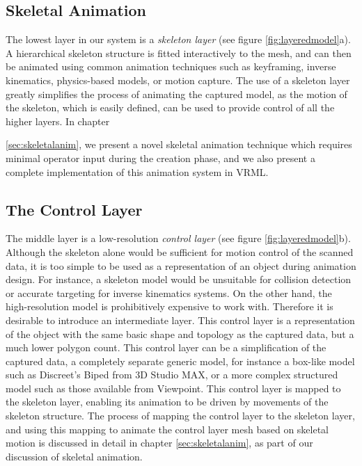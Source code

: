 \subsection{\label{sec:introduction:layered:skeletal}Skeletal Animation}
The lowest layer in our system is a {\it skeleton layer} (see figure \ref{fig:layeredmodel}a). A hierarchical skeleton structure is fitted interactively to the mesh, and can then be animated using common animation techniques such as keyframing, inverse kinematics, physics-based models, or motion capture. The use of a skeleton layer greatly simplifies the process of animating the captured model, as the motion of the skeleton, which is easily defined, can be used to provide control of all the higher layers. In chapter {\ref{sec:skeletalanim}, we present a novel skeletal animation technique which requires minimal operator input during the creation phase, and we also present a complete implementation of this animation system in VRML.

\subsection{\label{sec:introduction:layered:control}The Control Layer}
The middle layer is a low-resolution {\it control layer} (see figure \ref{fig:layeredmodel}b). Although the skeleton alone would be sufficient for motion control of the scanned data, it is too simple to be used as a representation of an object during animation design. For instance, a skeleton model would be unsuitable for collision detection or accurate targeting for inverse kinematics systems. On the other hand, the high-resolution model is prohibitively expensive to work with. Therefore it is desirable to introduce an intermediate layer. This control layer is a representation of the object with the same basic shape and topology as the captured data, but a much lower polygon count. This control layer can be a simplification of the captured data, a completely separate generic model, for instance a box-like model such as Discreet's Biped from 3D Studio MAX\cite{3DSMAX}, or a more complex structured model such as those available from Viewpoint\cite{Viewpoint}. This control layer is mapped to the skeleton layer, enabling its animation to be driven by movements of the skeleton structure. The process of mapping the control layer to the skeleton layer, and using this mapping to animate the control layer mesh based on skeletal motion is discussed in detail in chapter \ref{sec:skeletalanim}, as part of our discussion of skeletal animation. 

}

